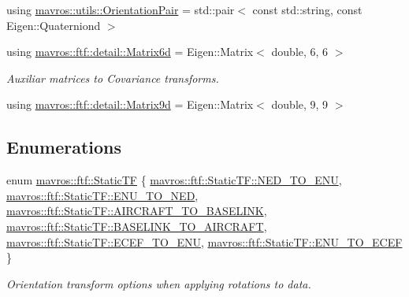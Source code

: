 \begin{DoxyCompactItemize}
\item 
using \mbox{\hyperlink{group__nodelib_ga5f662b76cd833191017cb702a0d49986}{mavros\+::utils\+::\+Orientation\+Pair}} = std\+::pair$<$ const std\+::string, const Eigen\+::\+Quaterniond $>$
\item 
using \mbox{\hyperlink{group__nodelib_ga510487eae2b1df3a44a6e645120b0389}{mavros\+::ftf\+::detail\+::\+Matrix6d}} = Eigen\+::\+Matrix$<$ double, 6, 6 $>$
\begin{DoxyCompactList}\small\item\em Auxiliar matrices to Covariance transforms. \end{DoxyCompactList}\item 
using \mbox{\hyperlink{group__nodelib_ga8aed658f3bc8ce4b4d5776a82c8ef67e}{mavros\+::ftf\+::detail\+::\+Matrix9d}} = Eigen\+::\+Matrix$<$ double, 9, 9 $>$
\end{DoxyCompactItemize}
\subsection*{Enumerations}
\begin{DoxyCompactItemize}
\item 
enum \mbox{\hyperlink{group__nodelib_gacff0983128574bbbe115917b13e57a63}{mavros\+::ftf\+::\+Static\+TF}} \{ \newline
\mbox{\hyperlink{group__nodelib_ggacff0983128574bbbe115917b13e57a63a54ebbdd04042b8ac08b760aedb956d2c}{mavros\+::ftf\+::\+Static\+T\+F\+::\+N\+E\+D\+\_\+\+T\+O\+\_\+\+E\+NU}}, 
\mbox{\hyperlink{group__nodelib_ggacff0983128574bbbe115917b13e57a63ae769945757a52e40e0bdeffb65ef82c5}{mavros\+::ftf\+::\+Static\+T\+F\+::\+E\+N\+U\+\_\+\+T\+O\+\_\+\+N\+ED}}, 
\mbox{\hyperlink{group__nodelib_ggacff0983128574bbbe115917b13e57a63ab9e9881bc4e56047c35acaf00ba7a06a}{mavros\+::ftf\+::\+Static\+T\+F\+::\+A\+I\+R\+C\+R\+A\+F\+T\+\_\+\+T\+O\+\_\+\+B\+A\+S\+E\+L\+I\+NK}}, 
\mbox{\hyperlink{group__nodelib_ggacff0983128574bbbe115917b13e57a63ad6c3de7e2c38d9686e41a621ccfcfa86}{mavros\+::ftf\+::\+Static\+T\+F\+::\+B\+A\+S\+E\+L\+I\+N\+K\+\_\+\+T\+O\+\_\+\+A\+I\+R\+C\+R\+A\+FT}}, 
\newline
\mbox{\hyperlink{group__nodelib_ggacff0983128574bbbe115917b13e57a63ac0ec6eeec303cc411db7d439dbde623c}{mavros\+::ftf\+::\+Static\+T\+F\+::\+E\+C\+E\+F\+\_\+\+T\+O\+\_\+\+E\+NU}}, 
\mbox{\hyperlink{group__nodelib_ggacff0983128574bbbe115917b13e57a63a50787c17df83b45631e5bcd831ae1ee8}{mavros\+::ftf\+::\+Static\+T\+F\+::\+E\+N\+U\+\_\+\+T\+O\+\_\+\+E\+C\+EF}}
 \}
\begin{DoxyCompactList}\small\item\em Orientation transform options when applying rotations to data. \end{DoxyCompactList}\end{DoxyCompactItemize}
